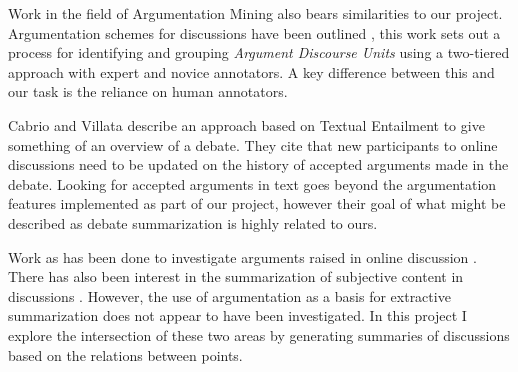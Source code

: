     Work in the field of Argumentation Mining also bears similarities to our project. Argumentation schemes for discussions have been outlined \cite{ghosh2014analyzing}, this work sets out a process for identifying and grouping \textit{Argument Discourse Units} using a two-tiered approach with expert and novice annotators. A key difference between this and our task is the reliance on human annotators.

    Cabrio and Villata \cite{cabrio2012combining} describe an approach based on Textual Entailment to give something of an overview of a debate. They cite that new participants to online discussions need to be updated on the history of accepted arguments made in the debate. Looking for accepted arguments in text goes beyond the argumentation features implemented as part of our project, however their goal of what might be described as debate summarization is highly related to ours.

    Work as has been done to investigate arguments raised in online discussion \cite{boltuzic2015identifying,cabrio2012combining,ghosh2014analyzing}. There has also been interest in the summarization of subjective content in discussions \cite{hu2004mining,lloret2009towards,galley2004identifying}. However, the use of argumentation as a basis for extractive summarization does not appear to have been investigated. In this project I explore the intersection of these two areas by generating summaries of discussions based on the relations between points.
